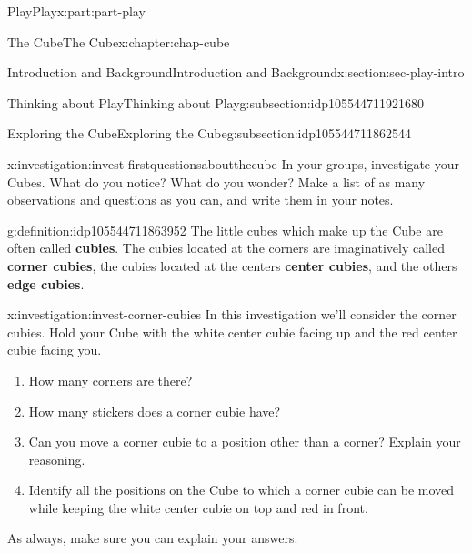 \documentclass[oneside,10pt,]{book}
\newcommand{\terminology}[1]{\textbf{#1}}
\numberwithin{equation}{section}
\begin{document}
\begin{partptx}{Play}{}{Play}{}{}{x:part:part-play}
\begin{chapterptx}{The Cube}{}{The Cube}{}{}{x:chapter:chap-cube}
\begin{sectionptx}{Introduction and Background}{}{Introduction and Background}{}{}{x:section:sec-play-intro}
\begin{subsectionptx}{Thinking about Play}{}{Thinking about Play}{}{}{g:subsection:idp105544711921680}
\end{subsectionptx}
%
%
\typeout{************************************************}
\typeout{************************************************}
%
\begin{subsectionptx}{Exploring the Cube}{}{Exploring the Cube}{}{}{g:subsection:idp105544711862544}
\begin{investigation}{}{x:investigation:invest-firstquestionsaboutthecube}%
In your groups, investigate your Cubes. What do you notice? What do you wonder? Make a list of as many observations and questions as you can, and write them in your notes.%
\end{investigation}%
\begin{definition}{}{g:definition:idp105544711863952}%
%
%
%
%
The little cubes which make up the Cube are often called \terminology{cubies}. The cubies located at the corners are imaginatively called \terminology{corner cubies}, the cubies located at the centers \terminology{center cubies}, and the others \terminology{edge cubies}.%
\end{definition}
\begin{investigation}{}{x:investigation:invest-corner-cubies}%
In this investigation we'll consider the corner cubies. Hold your Cube with the white center cubie facing up and the red center cubie facing you.%
\begin{enumerate}
\item{}How many corners are there?%
\item{}How many stickers does a corner cubie have?%
\item{}Can you move a corner cubie to a position other than a corner? Explain your reasoning.%
\item{}Identify all the positions on the Cube to which a corner cubie can be moved while keeping the white center cubie on top and red in front.%
\end{enumerate}
As always, make sure you can explain your answers.%
\begin{image}{0.25}{0.5}{0.25}%

\end{image}
\end{investigation}
\end{subsectionptx}
\end{sectionptx}
\end{chapterptx}
\end{partptx}
\end{document}
